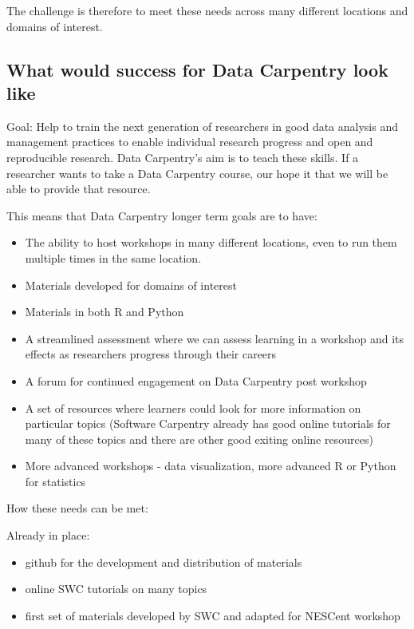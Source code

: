 \documentclass[11pt]{article}
\begin{document}
The challenge is therefore to meet these needs across many different locations and domains of interest.

\subsection{What would success for Data Carpentry look like}

\hangindent=0.7cm Goal: Help to train the next generation of researchers in good data analysis and management practices
to enable individual research progress and open and reproducible research. Data Carpentry's aim is to teach these skills. If a researcher wants to take a Data Carpentry course, our hope it that we will be 
able to provide that resource.

This means that Data Carpentry longer term goals are to have:

\begin{itemize}
\item The ability to host workshops in many different locations, even to run
them multiple times in the same location. 
\item Materials developed for domains of interest 
\item Materials in both R and Python 
\item A streamlined assessment where we can assess learning in a workshop and its effects
as researchers progress through their careers
\item A forum for continued engagement on Data Carpentry post workshop
\item A set of resources where learners could look for more information on particular topics
(Software Carpentry already has good online tutorials for many of these topics and there are other good exiting online resources)
\item More advanced workshops - data visualization, more advanced R or Python for statistics
\end{itemize}


How these needs can be met:

Already in place:
\begin{itemize}
\item github for the development and distribution of materials
\item online SWC tutorials on many topics
\item first set of materials developed by SWC and adapted for NESCent workshop
\end{itemize}
\end{document}
